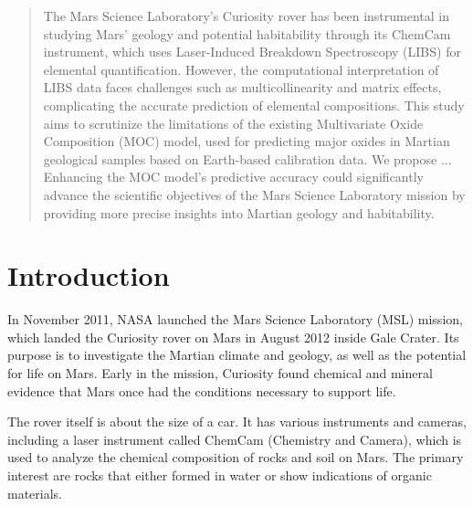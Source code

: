 \begin{abstract}
The Mars Science Laboratory's Curiosity rover has been instrumental in studying Mars' geology and potential habitability through its ChemCam instrument, which uses Laser-Induced Breakdown Spectroscopy (LIBS) for elemental quantification.
However, the computational interpretation of LIBS data faces challenges such as multicollinearity and matrix effects, complicating the accurate prediction of elemental compositions.
This study aims to scrutinize the limitations of the existing Multivariate Oxide Composition (MOC) model, used for predicting major oxides in Martian geological samples based on Earth-based calibration data.
We propose ...
Enhancing the MOC model's predictive accuracy could significantly advance the scientific objectives of the Mars Science Laboratory mission by providing more precise insights into Martian geology and habitability.
\end{abstract}



\section{Introduction}
In November 2011, NASA launched the Mars Science Laboratory (MSL) mission, which landed the Curiosity rover on Mars in August 2012 inside Gale Crater. Its purpose is to investigate the Martian climate and geology, as well as the potential for life on Mars.
Early in the mission, Curiosity found chemical and mineral evidence that Mars once had the conditions necessary to support life.\cite{chemcam_nasa_website}

The rover itself is about the size of a car.
It has various instruments and cameras, including a laser instrument called ChemCam (Chemistry and Camera), which is used to analyze the chemical composition of rocks and soil on Mars.
The primary interest are rocks that either formed in water or show indications of organic materials.\cite{chemcam_nasa_website}

